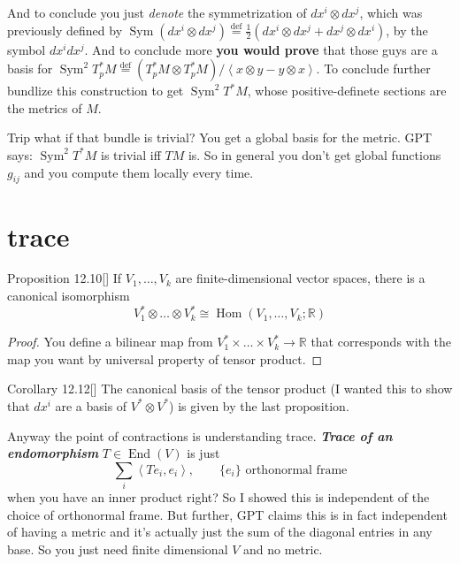 And to conclude you just \textit{denote} the symmetrization of \(dx^i \otimes dx^j\), which was previously defined by \(\operatorname{Sym}(dx^i \otimes dx^j)\overset{\operatorname{def}}{=}\frac{1}{2}(dx^i \otimes dx^j +dx^j \otimes dx^i)\), by the symbol \(dx^idx^j\). And to conclude more \textbf{you would prove} that those guys are a basis for \(\operatorname{Sym}^2T_p^*M\overset{\operatorname{def}}{=}(T_p^* M \otimes T_p^*M)/\left<x \otimes y-y \otimes x\right>\). To conclude further bundlize this construction to get \(\operatorname{Sym}^2T^*M\), whose positive-definete sections are the metrics of \(M\).

\begin{thing8}{Trip}\leavevmode
what if that bundle is trivial? You get a global basis for the metric. GPT says: \(\operatorname{Sym}^2T^*M\) is trivial iff \(TM\) is. So in general you don't get global functions \(g_{ij}\) and you compute them locally every time.
\end{thing8}

\section{trace}

\begin{thing4}{Proposition 12.10}[\cite{les}]\label{prop:12.10}\leavevmode
If  \(V_1,\ldots,V_k\) are finite-dimensional vector spaces, there is a canonical isomorphism
\[V_1^*  \otimes\ldots \otimes V^*_k \cong \operatorname{Hom}(V_1,\ldots,V_k;\mathbb{R})\]
\end{thing4}
\begin{proof}\leavevmode
You define a bilinear map from \(V^*_1 \times \ldots \times V^*_k \to \mathbb{R}\) that corresponds with the map you want by universal property of tensor product.
\end{proof}

\begin{thing6}{Corollary 12.12}[\cite{les}]\leavevmode
The canonical basis of the tensor product (I wanted this to show that \(dx^i\) are a basis of \(V^* \otimes V^*\)) is given by the last proposition.
\end{thing6}

Anyway the point of contractions is understanding trace. \textit{\textbf{Trace of an endomorphism}} \(T \in \operatorname{End}(V)\) is just
\[\sum_i \left<Te_i,e_i\right>,\qquad \{e_i\}\text{ orthonormal frame} \]
when you have an inner product right? So I showed this is independent of the choice of orthonormal frame. But further, GPT claims this is in fact independent of having a metric and it's actually just the sum of the diagonal entries in any base. So you just need finite dimensional \(V\) and no metric.

